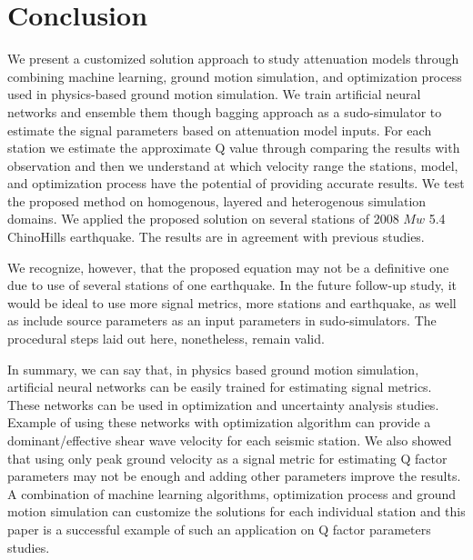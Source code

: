 \section{Conclusion}

We present a customized solution approach to study attenuation models through combining machine learning, ground motion simulation, and optimization process used in physics-based ground motion simulation. We train artificial neural networks and ensemble them though bagging approach as a sudo-simulator to estimate the signal parameters based on attenuation model inputs. For each station we estimate the approximate Q value through comparing the results with observation and then we understand at which velocity range the stations, model, and optimization process have the potential of providing accurate results. We test the proposed method on homogenous, layered and heterogenous simulation domains. We applied the proposed solution on several stations of 2008 $Mw$ 5.4 ChinoHills earthquake. The results are in agreement with previous studies. 

We recognize, however, that the proposed equation may not be a definitive one due to use of several stations of one earthquake. In the future follow-up study, it would be ideal to use more signal metrics, more stations and earthquake, as well as include source parameters as an input parameters in sudo-simulators. The procedural steps laid out here, nonetheless, remain valid.    

In summary, we can say that, in physics based ground motion simulation, artificial neural networks can be easily trained for estimating signal metrics. These networks can be used in optimization and uncertainty analysis studies. Example of using these networks with optimization algorithm can provide a dominant/effective shear wave velocity for each seismic station. We also showed that using only peak ground velocity as a signal metric for estimating Q factor parameters may not be enough and adding other parameters improve the results. A combination of machine learning algorithms, optimization process and ground motion simulation can customize the solutions for each individual station and this paper is a successful example of such an application on Q factor parameters studies. 




